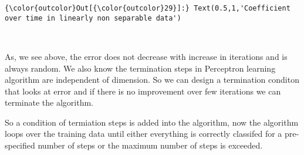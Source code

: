 \documentclass[11pt]{article}
\begin{document}
\begin{Verbatim}[commandchars=\\\{\}]
{\color{outcolor}Out[{\color{outcolor}29}]:} Text(0.5,1,'Coefficient over time in linearly non separable data')
\end{Verbatim}
            
    \begin{center}
    \end{center}
    { \hspace*{\fill} \\}
    
    As, we see above, the error does not decrease with increase in
iterations and is always random. We also know the termination steps in
Perceptron learning algorithm are independent of dimension. So we can
design a termination conditon that looks at error and if there is no
improvement over few iterations we can terminate the algorithm.

    So a condition of termiation steps is added into the algorithm, now the
algorithm loops over the training data until either everything is
correctly classifed for a pre-specified number of steps or the maximum
number of steps is exceeded.


    
    
    
    
\end{document}
